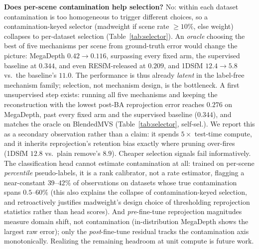 \documentclass{article}
\newcommand{\mad}{madweight}
\begin{document}
\noindent\textbf{Does per-scene contamination help selection?} No: within each dataset
contamination is too homogeneous to trigger different choices, so a contamination-keyed
selector (\mad{} if scene rate ${\ge}10\%$, else weight) collapses to per-dataset
selection (Table~\ref{tab:selector}). An \emph{oracle} choosing the best of five
mechanisms per scene from ground-truth error would change the picture: MegaDepth
$0.42\!\to\!0.116$, surpassing every fixed arm, the supervised baseline at $0.344$,
and even RESfM-released at $0.209$, and 1DSfM $12.4\!\to\!5.8$ vs.\ the
baseline's $11.0$. The performance is thus already \emph{latent} in the label-free mechanism family;
selection, not mechanism design, is the bottleneck. A first unsupervised step exists:
running all five mechanisms and keeping the reconstruction with the lowest post-BA
reprojection error reaches $0.276$ on MegaDepth, past every fixed arm and the supervised
baseline ($0.344$), and matches the oracle on BlendedMVS (Table~\ref{tab:selector},
self-sel.). We report this as a secondary observation rather than a claim: it spends
$5\times$ test-time compute, and it inherits reprojection's retention bias exactly where
pruning over-fires (1DSfM $12.8$ vs.\ plain remove's $8.9$). Cheaper selection signals
fail informatively. The classification head cannot estimate contamination at all:
trained on per-scene \emph{percentile} pseudo-labels, it is a rank calibrator, not a
rate estimator, flagging a near-constant $39$--$42\%$ of observations on datasets
whose true contamination spans $0.5$--$60\%$ (this also explains the collapse of
contamination-keyed selection, and retroactively justifies \mad{}'s design choice of
thresholding reprojection statistics rather than head scores). And \emph{pre}-fine-tune
reprojection magnitudes measure domain shift, not contamination (in-distribution
MegaDepth shows the largest raw error); only the \emph{post}-fine-tune residual tracks
the contamination axis monotonically. Realizing the remaining headroom at unit compute
is future work.
\end{document}
